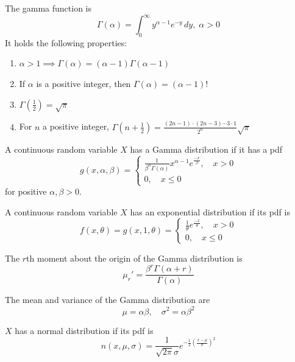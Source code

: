 \documentclass[11pt]{article}
\begin{document}
\begin{definition}
    The gamma function is
    \[
        \Gamma(\alpha) = \int_{0}^{\infty} y^{\alpha-1}e^{-y}\, dy, \; \alpha > 0
    \]
    It holds the following properties:
    \begin{enumerate}
        \item $\alpha>1 \implies \Gamma(\alpha) = (\alpha-1)\Gamma(\alpha-1)$
        \item If $\alpha$ is a positive integer, then $\Gamma(\alpha) = (\alpha - 1)!$
        \item $\Gamma(\frac{1}{2}) = \sqrt{\pi}$
        \item For $n$ a positive integer, $\Gamma(n+\frac{1}{2}) = \frac{(2n-1)\cdot(2n-3)\cdots 3\cdot 1}{2^n} \sqrt{\pi}$
    \end{enumerate}
    
\end{definition}
\begin{definition}
    A continuous random variable $X$ has a Gamma distribution if it has a pdf
    \[
        g(x,\alpha, \beta) = 
        \begin{cases}
            \frac{1}{\beta^\alpha \Gamma(\alpha)} x^{\alpha-1}e^{\frac{-x}{\beta}}, \quad x > 0\\
            0, \quad x \le 0
             
        \end{cases}
    \]
    for positive $\alpha, \beta > 0$.
\end{definition}

\begin{definition}
    A continuous random variable $X$ has an exponential distribution if its pdf is 
    \[
        f(x, \theta) = g(x,1,\theta) = 
        \begin{cases}
            \frac{1}{\theta} e^{\frac{-x}{\theta}}, \quad x > 0 \\
             0, \quad x \le 0
        \end{cases}
    \]
    
\end{definition}
\begin{theorem}
    The $r$th moment about the origin of the Gamma distribution is 
    \[
        \mu_r' = \frac{\beta^r \Gamma(\alpha + r)}{\Gamma(\alpha)}
    \]
    
\end{theorem}
\begin{theorem}
    The mean and variance of the Gamma distribution are 
    \[
        \mu = \alpha \beta, \quad \sigma^2 = \alpha \beta^2
    \]
    
\end{theorem}
\begin{definition}
    $X$ has a normal distribution if its pdf is
    \[
        n(x,\mu, \sigma) = \frac{1}{\sqrt{2\pi}\sigma}e^{-\frac{1}{2}(\frac{x-\mu}{\sigma})^2}
    \]
    
\end{definition}
\end{document}
